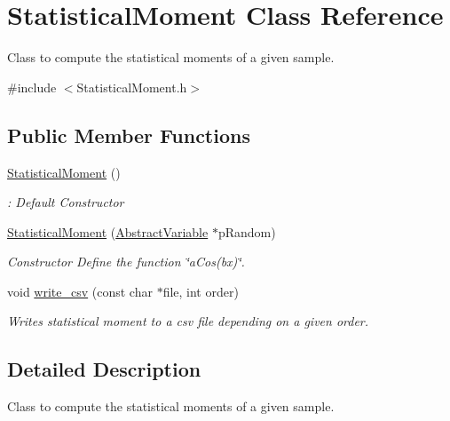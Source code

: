 \hypertarget{classStatisticalMoment}{}\section{Statistical\+Moment Class Reference}
\label{classStatisticalMoment}


Class to compute the statistical moments of a given sample.  




{\ttfamily \#include $<$Statistical\+Moment.\+h$>$}

\subsection*{Public Member Functions}
\begin{DoxyCompactItemize}
\item 
\mbox{\label{classStatisticalMoment_a7f8b1aac6a3740091045e20dcc68fa51}} 
\hyperlink{classStatisticalMoment_a7f8b1aac6a3740091045e20dcc68fa51}{Statistical\+Moment} ()
\begin{DoxyCompactList}\small\item\em \+: Default Constructor \end{DoxyCompactList}\item 
\hyperlink{classStatisticalMoment_a31fd5717c856681fc9535837e82fcfbe}{Statistical\+Moment} (\hyperlink{classAbstractVariable}{Abstract\+Variable} $\ast$p\+Random)
\begin{DoxyCompactList}\small\item\em Constructor Define the function \char`\"{}a\+Cos(bx)\char`\"{}. \end{DoxyCompactList}\item 
void \hyperlink{classStatisticalMoment_a7e0fb1cf645bfd8cda912d78c1aa20ed}{write\+\_\+csv} (const char $\ast$file, int order)
\begin{DoxyCompactList}\small\item\em Writes statistical moment to a csv file depending on a given order. \end{DoxyCompactList}\end{DoxyCompactItemize}


\subsection{Detailed Description}
Class to compute the statistical moments of a given sample. 


